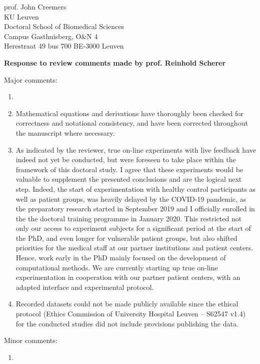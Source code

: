 \documentclass{letter}
\newcommand{\reply}[1]{%
	\textbf{Response to review comments made by prof. #1}

}
\begin{document}
\begin{letter}{
	prof. John Creemers \\
	KU Leuven \\
	Doctoral School of Biomedical Sciences \\
	Campus Gasthuisberg, O\&N 4 \\
	Herestraat 49 bus 700
	BE-3000 Leuven

}
\reply{Reinhold Scherer}
Major comments:
\begin{enumerate}
	\item {}
	\item  Mathematical equations and derivations have thoroughly
	been checked for correctness and notational consistency, and have been
	corrected throughout the manuscript where necessary.
	\item As indicated by the reviewer, true on-line experiments with live
	feedback have indeed not yet be conducted, but were foreseen to take
	place within the framework of this doctoral study.
	I agree that these experiments would be valuable to supplement the
	presented conclusions and are the logical next step.
	Indeed, the start of experimentation with healthy control participants
	as well as patient groups, was heavily delayed by the COVID-19 pandemic, as the
	preparatory research started in September 2019 and I officially
	enrolled in the the doctoral training programme in January 2020.
	This restricted not only our access to experiment subjects for a
	significant period at the start of the PhD, and even longer for
	vulnerable patient groups, but also shifted priorities for the medical
	staff at our partner institutions and patient centers.
	Hence, work early in the PhD mainly focused on the development of
	computational methods.
	We are currently starting up true on-line experimentation in cooperation
	with our partner patient centers, with an adapted interface and experimental protocol.
	\item Recorded datasets could not be made publicly available since the
	ethical protocol (Ethics Commission of University Hospital Leuven --
	S62547 v1.4) for the conducted studies did not include provisions
	publishing the data.
\end{enumerate}
Minor comments:
\begin{enumerate}
	\item
\end{enumerate}


\end{letter}
\end{document}
